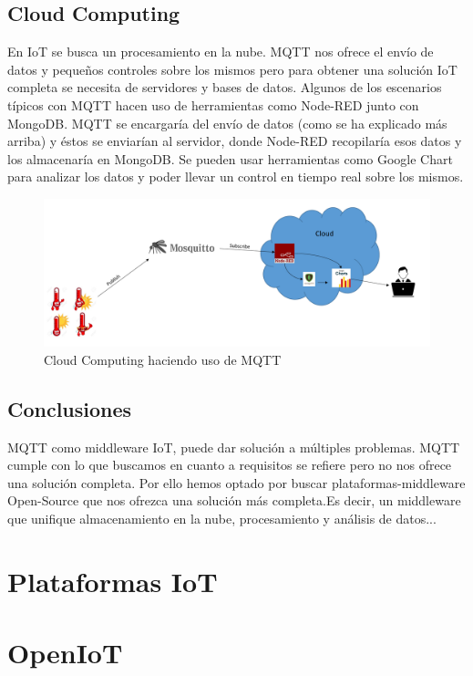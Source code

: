 \documentclass[12pt, twoside]{book}
\begin{document}
\section{Cloud Computing}
En IoT se busca un procesamiento en la nube. MQTT nos ofrece el envío de datos y pequeños controles sobre los mismos pero para obtener una solución IoT completa se necesita de servidores y bases de datos. Algunos de los escenarios típicos con MQTT hacen uso de herramientas como Node-RED\cite{nodered} junto con MongoDB\cite{mongo}. MQTT se encargaría del envío de datos (como se ha explicado más arriba) y éstos se enviarían al servidor, donde Node-RED recopilaría esos datos y los almacenaría en MongoDB. Se pueden usar herramientas como Google Chart para analizar los datos y poder llevar un control en tiempo real sobre los mismos. 
\begin{figure}[H]
\centering
\includegraphics[scale=0.4]{images/cloud_mqtt1}
\caption{Cloud Computing haciendo uso de MQTT}\label{L408}
\end{figure}



\section{Conclusiones}
MQTT como middleware IoT, puede dar solución a múltiples problemas. MQTT cumple con lo que buscamos en cuanto a requisitos se refiere pero no nos ofrece una solución completa. Por ello hemos optado por buscar plataformas-middleware Open-Source que nos ofrezca una solución más completa.Es decir, un middleware que unifique almacenamiento en la nube, procesamiento y análisis de datos...

\chapter{Plataformas IoT}

\chapter{OpenIoT}
\end{document}
